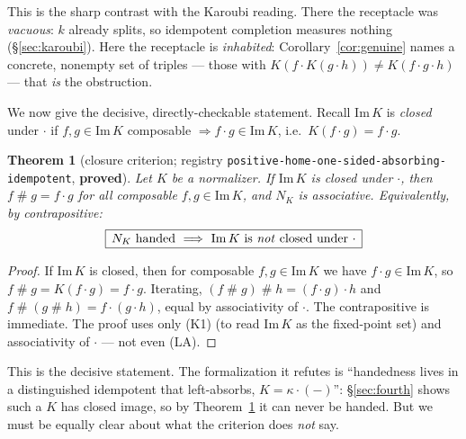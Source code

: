 \documentclass[11pt]{amsart}
\theoremstyle{plain}
\newtheorem{theorem}{Theorem}[section]
\theoremstyle{definition}
\theoremstyle{remark}
\newcommand{\Img}{\mathrm{Im}\,}
\newcommand{\sh}{\mathbin{\#}}
\newcommand{\LA}{\textsf{(LA)}}
\begin{document}
This is the sharp contrast with the Karoubi reading. There the receptacle was \emph{vacuous}: $k$
already splits, so idempotent completion measures nothing (\S\ref{sec:karoubi}). Here the receptacle
is \emph{inhabited}: Corollary~\ref{cor:genuine} names a concrete, nonempty set of triples --- those
with $K(f\cdot K(g\cdot h))\ne K(f\cdot g\cdot h)$ --- that \emph{is} the obstruction.

We now give the decisive, directly-checkable statement. Recall $\Img K$ is \emph{closed} under
$\cdot$ if $f,g\in\Img K$ composable $\Rightarrow f\cdot g\in\Img K$, i.e.\ $K(f\cdot g)=f\cdot g$.

\begin{theorem}[closure criterion; registry \texttt{positive-home-one-sided-absorbing-idempotent}, \textbf{proved}]
\label{thm:closure}
Let $K$ be a normalizer. If $\Img K$ is closed under $\cdot$, then $f\sh g=f\cdot g$ for all
composable $f,g\in\Img K$, and $N_{K}$ is associative. Equivalently, by contrapositive:
\[
  \boxed{\,N_{K}\text{ handed}\ \Longrightarrow\ \Img K\text{ is \emph{not} closed under }\cdot\,}
\]
\end{theorem}
\begin{proof}
If $\Img K$ is closed, then for composable $f,g\in\Img K$ we have $f\cdot g\in\Img K$, so
$f\sh g=K(f\cdot g)=f\cdot g$. Iterating, $(f\sh g)\sh h=(f\cdot g)\cdot h$ and
$f\sh(g\sh h)=f\cdot(g\cdot h)$, equal by associativity of $\cdot$. The contrapositive is immediate.
The proof uses only \textsf{(K1)} (to read $\Img K$ as the fixed-point set) and associativity of
$\cdot$ --- not even \LA{}.
\end{proof}

This is the decisive statement. The formalization it refutes is ``handedness lives in a distinguished
idempotent that left-absorbs, $K=\kappa\cdot(-)$'': \S\ref{sec:fourth} shows such a $K$ has closed
image, so by Theorem~\ref{thm:closure} it can never be handed. But we must be equally clear about
what the criterion does \emph{not} say.
\end{document}
